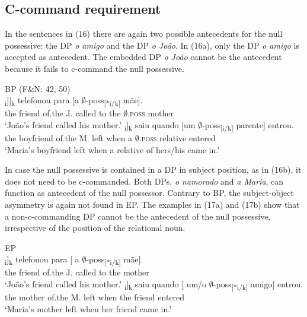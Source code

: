 \documentclass[output=paper]{langsci/langscibook}
\begin{document}
\subsection{C-command requirement}%

In the sentences in (16) there are again two possible antecedents for the null possessive: the DP \textit{o amigo} and the DP \textit{o João}. In (16a), only the DP \textit{o amigo} is accepted as antecedent. The embedded DP \textit{o João} cannot be the antecedent because it fails to c-command the null possessive.

\ea%
    BP (F\&N: 42, 50)\label{ex:wein:16}\\
    \ea
    \gll\relax [O amigo [d[o João]\textsubscript{i}]]\textsubscript{k} telefonou para [a $\emptyset$-poss\textsubscript{[}\textsubscript{*i/k]} mãe].\\
         the friend of.the J. called to the $\emptyset$\textsc{.poss} mother\\
    \glt ‘João’s friend called his mother.’
    \ex  
    \gll\relax [O namorado d[a Maria]\textsubscript{i}]\textsubscript{k} saiu quando [um $\emptyset$-poss\textsubscript{[i/}\textsubscript{k]} parente] entrou.\\
         the boyfriend of.the M. left when a $\emptyset$\textsc{.poss} relative entered\\
    \glt ‘Maria’s boyfriend left when a relative of hers\slash his came in.’
    \z
\z

In case the null possessive is contained in a DP in subject position, as in (16b), it does not need to be c-commanded. Both DPs, \textit{o namorado} and \textit{a Maria}, can function as antecedent of the null possessor. Contrary to BP, the subject-object asymmetry is again not found in EP. The examples in (17a) and (17b) show that a non-c-commanding DP cannot be the antecedent of the null possessive, irrespective of the position of the relational noun.

\ea%
    EP\label{ex:wein:17}\\
    \ea
    \gll [ O amigo d[o João]\textsubscript{i}]\textsubscript{k} telefonou para [ a $\emptyset$-poss\textsubscript{[*}\textsubscript{i/k]} mãe].\\
         {} the friend of.the J. called to {} the {} mother\\
    \glt ‘João’s friend called his mother.’
    \ex  
    \gll [ A mãe d[a Maria]\textsubscript{i}]\textsubscript{k} saiu quando [ um/o $\emptyset$-poss\textsubscript{[*i/k]} amigo] entrou. \\
         {} the mother of.the M. left when {} the {} friend entered \\
    \glt ‘Maria’s mother left when her friend came in.’ 
    \z
\z
\end{document}
